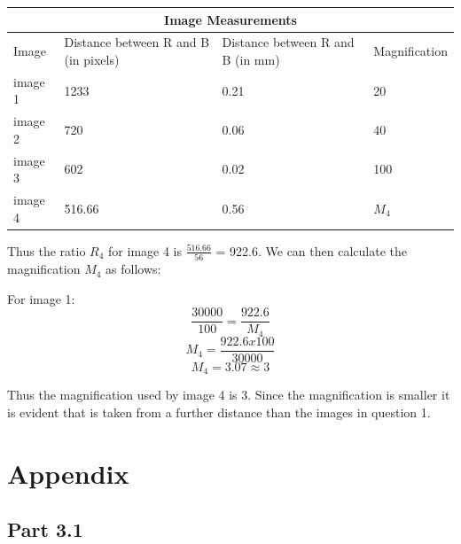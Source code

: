 \documentclass{article}
\begin{document}
\begin{tabular}{ |p{3cm}||p{3cm}|p{3cm}|p{3cm}| }
 \hline
 \multicolumn{4}{|c|}{Image Measurements} \\
 \hline
Image & Distance between R and B (in pixels) &Distance between R and B (in mm) & Magnification\\
 \hline 
 image 1 & 1233  & 0.21 &  20 \\
 image 2 & 720  &  0.06 &  40 \\
 image 3 & 602  &  0.02 &  100\\
 image 4 & 516.66 & 0.56 & $M_4$ \\
 \hline
\end{tabular}


Thus the ratio $R_4$ for image 4 is $\frac{516.66}{56}$ = 922.6. We can then calculate the magnification $M_4$ as follows:  

For image 1: 
\begin{equation}
\frac{30000}{100} = \frac{922.6}{M_{4}}
\end{equation}
\begin{equation}
M_{4} = \frac{922.6 x 100}{30000}
\end{equation}
\begin{equation}
M_{4} = 3.07 \approx 3
\end{equation}

Thus the magnification used by image 4 is 3. Since the magnification is smaller it is evident that is taken from a further distance than the images in question 1. 

\clearpage
\appendix
\section{Appendix}
\subsection*{Part 3.1}
\end{document}
